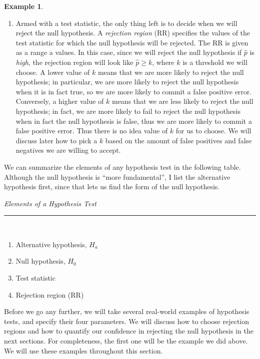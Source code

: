 \documentclass[12pt]{article}
\theoremstyle{definition}
\newtheorem*{example}{Example}
\theoremstyle{remark}
\begin{document}
\begin{example}
\begin{enumerate}
\item Armed with a test statistic, the only thing left is to decide when we will reject the null hypothesis. A \emph{rejection region} (RR) specifies the values of the test statistic for which the null hypothesis will be rejected. The RR is given as a range a values. In this case, since we will reject the null hypothesis if $\hat{p}$ is \emph{high}, the rejection region will look like $\hat{p} \geq k$, where $k$ is a threshold we will choose. A lower value of $k$ means that we are more likely to reject the null hypothesis; in particular, we are more likely to reject the null hypothesis when it is in fact true, so we are more likely to commit a false positive error. Conversely, a higher value of $k$ means that we are less likely to reject the null hypothesis; in fact, we are more likely to fail to reject the null hypothesis when in fact the null hypothesis is false, thus we are more likely to commit a false positive error. Thus there is no idea value of $k$ for us to choose. We will discuss later how to pick a $k$ based on the amount of false positives and false negatives we are willing to accept.
\end{enumerate}
\end{example}

We can summarize the elements of any hypothesis test in the following table. Although the null hypothesis is ``more fundamental'', I list the alternative hypothesis first, since that lets us find the form of the null hypothesis.

\begin{framed}
\emph{Elements of a Hypothesis Test}\\
  \rule{\dimexpr{}\fboxrule}{.1pt} \\
\begin{enumerate}
\item Alternative hypothesis, $H_a$
\item Null hypothesis, $H_0$
\item Test statistic
\item Rejection region (RR)
\end{enumerate}
\end{framed}

Before we go any further, we will take several real-world examples of hypothesis tests, and specify their four parameters. We will discuss how to choose rejection regions and how to quantify our confidence in rejecting the null hypothesis in the next sections. For completeness, the first one will be the example we did above. We will use these examples throughout this section.
\end{document}
